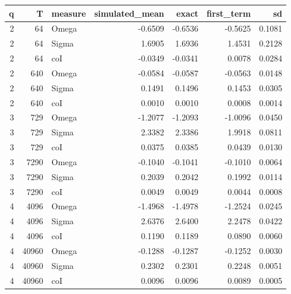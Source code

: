 \begin{tabular}{rrlrrrr}
\toprule
q & T & measure & simulated_mean & exact & first_term & sd \\
\midrule
2 & 64 & Omega & -0.6509 & -0.6536 & -0.5625 & 0.1081 \\
2 & 64 & Sigma & 1.6905 & 1.6936 & 1.4531 & 0.2128 \\
2 & 64 & coI & -0.0349 & -0.0341 & 0.0078 & 0.0284 \\
2 & 640 & Omega & -0.0584 & -0.0587 & -0.0563 & 0.0148 \\
2 & 640 & Sigma & 0.1491 & 0.1496 & 0.1453 & 0.0305 \\
2 & 640 & coI & 0.0010 & 0.0010 & 0.0008 & 0.0014 \\
3 & 729 & Omega & -1.2077 & -1.2093 & -1.0096 & 0.0450 \\
3 & 729 & Sigma & 2.3382 & 2.3386 & 1.9918 & 0.0811 \\
3 & 729 & coI & 0.0375 & 0.0385 & 0.0439 & 0.0130 \\
3 & 7290 & Omega & -0.1040 & -0.1041 & -0.1010 & 0.0064 \\
3 & 7290 & Sigma & 0.2039 & 0.2042 & 0.1992 & 0.0114 \\
3 & 7290 & coI & 0.0049 & 0.0049 & 0.0044 & 0.0008 \\
4 & 4096 & Omega & -1.4968 & -1.4978 & -1.2524 & 0.0245 \\
4 & 4096 & Sigma & 2.6376 & 2.6400 & 2.2478 & 0.0422 \\
4 & 4096 & coI & 0.1190 & 0.1189 & 0.0890 & 0.0060 \\
4 & 40960 & Omega & -0.1288 & -0.1287 & -0.1252 & 0.0030 \\
4 & 40960 & Sigma & 0.2302 & 0.2301 & 0.2248 & 0.0051 \\
4 & 40960 & coI & 0.0096 & 0.0096 & 0.0089 & 0.0005 \\
\bottomrule
\end{tabular}
